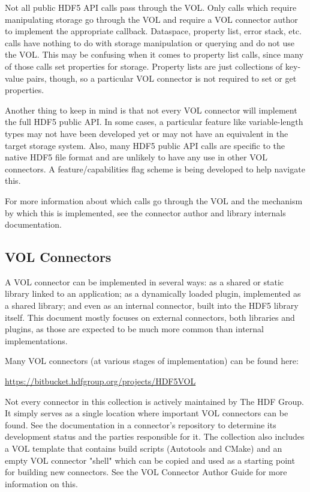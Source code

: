 Not all public HDF5 API calls pass through the VOL. Only calls which require manipulating storage go through the VOL and require a VOL connector author to implement the appropriate callback. Dataspace, property list, error stack, etc. calls have nothing to do with storage manipulation or querying and do not use the VOL. This may be confusing when it comes to property list calls, since many of those calls set properties for storage. Property lists are just collections of key-value pairs, though, so a particular VOL connector is not required to set or get properties.

Another thing to keep in mind is that not every VOL connector will implement the full HDF5 public API. In some cases, a particular feature like variable-length types may not have been developed yet or may not have an equivalent in the target storage system. Also, many HDF5 public API calls are specific to the native HDF5 file format and are unlikely to have any use in other VOL connectors. A feature/capabilities flag scheme is being developed to help navigate this.

For more information about which calls go through the VOL and the mechanism by which this is implemented, see the connector author and library internals documentation.

\subsection{VOL Connectors}

A VOL connector can be implemented in several ways: as a shared or static library linked to an application; as a dynamically loaded plugin, implemented as a shared library; and even as an internal connector, built into the HDF5 library itself. This document mostly focuses on external connectors, both libraries and plugins, as those are expected to be much more common than internal implementations.

Many VOL connectors (at various stages of implementation) can be found here:

\quad \quad \url{https://bitbucket.hdfgroup.org/projects/HDF5VOL}

Not every connector in this collection is actively maintained by The HDF Group. It simply serves as a single location where important VOL connectors can be found. See the documentation in a connector's repository to determine its development status and the parties responsible for it. The collection also includes a VOL template that contains build scripts (Autotools and CMake) and an empty VOL connector "shell" which can be copied and used as a starting point for building new connectors. See the VOL Connector Author Guide for more information on this.

